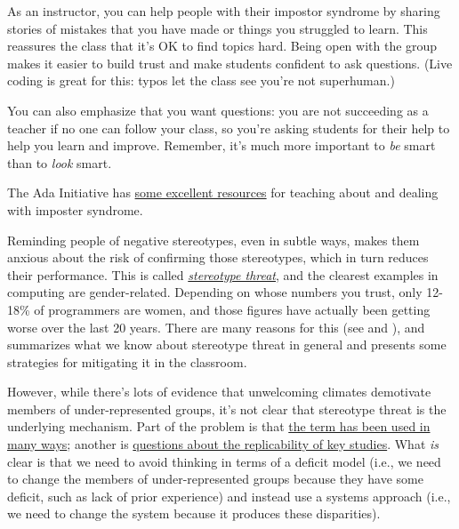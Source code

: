 As an instructor, you can help people with their impostor syndrome by
sharing stories of mistakes that you have made or things you struggled
to learn. This reassures the class that it's OK to find topics hard.
Being open with the group makes it easier to build trust and make
students confident to ask questions. (Live coding is great for this:
typos let the class see you're not superhuman.)

You can also emphasize that you want questions: you are not succeeding
as a teacher if no one can follow your class, so you're asking
students for their help to help you learn and improve. Remember, it's
much more important to \emph{be} smart than to \emph{look} smart.

The Ada Initiative has
\href{http://adainitiative.org/continue-our-work/impostor-syndrome-training/}{some
excellent resources} for teaching about and dealing with imposter
syndrome.


Reminding people of negative stereotypes, even in subtle ways, makes
them anxious about the risk of confirming those stereotypes, which in
turn reduces their performance. This is called
\emph{\href{https://en.wikipedia.org/wiki/Stereotype\_threat}{stereotype
threat}}, and the clearest examples in computing are gender-related.
Depending on whose numbers you trust, only 12-18\% of programmers are
women, and those figures have actually been getting worse over the
last 20 years. There are many reasons for this (see
\cite{bib:margolis-fisher} and \cite{bib:margolis-shallow-end}),
and \cite{bib:steele-vivaldi} summarizes what we know about stereotype
threat in general and presents some strategies for mitigating it in
the classroom.

However, while there's lots of evidence that unwelcoming climates
demotivate members of under-represented groups, it's not clear that
stereotype threat is the underlying mechanism. Part of the problem is
that
\href{http://www.europhd.net/html/\_onda02/07/PDF/20th\_lab\_materials/jane/shapiro\_neuberg\_2007.pdf}{the
term has been used in many ways}; another is
\href{https://www.psychologytoday.com/blog/rabble-rouser/201512/is-stereotype-threat-overcooked-overstated-and-oversold}{questions
about the replicability of key studies}. What \emph{is} clear is that we
need to avoid thinking in terms of a deficit model (i.e., we need to
change the members of under-represented groups because they have some
deficit, such as lack of prior experience) and instead use a systems
approach (i.e., we need to change the system because it produces these
disparities).


